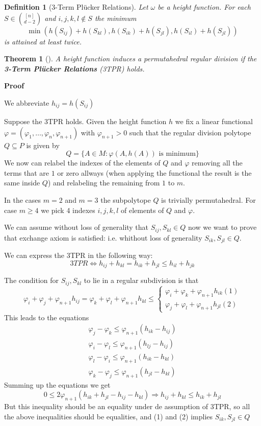 \documentclass{myclass}
\newtheorem*{definition}{Definition}
\newtheorem*{theorem}{Theorem}
\begin{document}
\begin{definition}[3-Term Plücker Relations] Let $\omega $ be a height function.
For each $S\in \binom{[n]}{ d-2}$ and $i, j, k, l \not\in S$ the minimum
\[
\min (h(S_{ij}) + h(S_{kl}), h(S_{ik}) + h(S_{jl}), h(S_{il}) +  h(S_{jl}))
\] 
is attained at least twice.
\end{definition}

\begin{theorem}[] A height function induces a permutahedral regular division if the \textbf{3-Term Plücker Relations} (3TPR) holds.
\end{theorem}


\textbf{Proof}

We abbreviate $h_{ij} = h(S_{ij})$

Suppose the 3TPR holds. Given the height function $h$ we fix a linear functional $\varphi = (\varphi _1, \ldots, \varphi _n, \varphi _{n+1})$ with $\varphi _{n+1}>0$ such that the regular division polytope $Q\subseteq P$ is given by
\[
Q = \{A\in M : \varphi (A, h(A)) \text{ is minimum}\}
\] 
We now can relabel the indexes of the elements of $Q$ and $\varphi $ removing all the terms that are $1$ or zero allways (when applying the functional the result is the same inside $Q$) and relabeling the remaining from $1$ to  $m$.

In the cases $m = 2$ and  $m=3$ the subpolytope $Q$ is trivially permutahedral. For case $m\ge 4$ we pick 4 indexes $i, j, k, l$ of elements of $Q$ and $\varphi $. 

We can assume without loss of generality that $S_{ij}, S_{kl} \in Q$ now we want to prove that exchange axiom is satisfied: i.e. whithout loss of generality $S_{ik}, S_{jl}\in Q$.

We can express the 3TPR in the following way:
\[
  3TPR \iff h_{ij} + h_{kl} = h_{ik} + h_{jl}\le h_{il} + h_{jk}
\] 

The condition for $S_{ij}, S_{kl}$ to lie in a regular subdivision is that
\[
\varphi _i + \varphi _j + \varphi _{n+1} h_{ij} = 
\varphi _k + \varphi _l + \varphi _{n+1} h_{kl} \le 
\begin{cases}
  \varphi _i + \varphi _k + \varphi _{n+1}h_{ik} (1)\\
  \varphi _j + \varphi _l + \varphi _{n+1}h_{jl} (2)
\end{cases}
\] 
This leads to the equations
\begin{align*}
 \varphi _j - \varphi _k \le \varphi _{n+1}(h_{ik}-h_{ij})  \\
 \varphi _i - \varphi _l \le \varphi _{n+1}(h_{lj}-h_{ij})  \\
 \varphi _l - \varphi _i \le \varphi _{n+1}(h_{ik}-h_{kl})  \\
 \varphi _k - \varphi _j \le \varphi _{n+1}(h_{jl}-h_{kl})
\end{align*}
Summing up the equations we get
\[
0\le 2\varphi_{n+1}(h_{ik}+ h_{jl} - h_{ij}-h_{kl}) \Rightarrow h_{ij} + h_{kl} \le h_{ik} + h_{jl}
\] 
But this inequality should be an equality under de assumption of 3TPR, so all the above inequalities should be equalities, and (1) and (2) implies $S_{ik}, S_{jl}\in Q$
\end{document}
